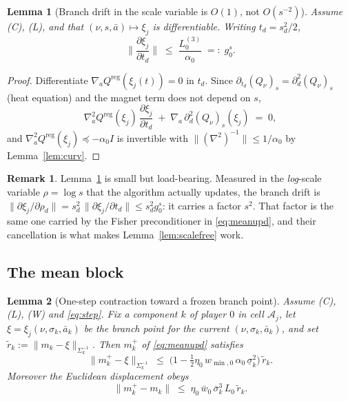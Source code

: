 \documentclass[11pt]{article}
\newtheorem{lemma}{Lemma}
\theoremstyle{definition}
\newtheorem{remark}{Remark}
\newcommand{\cA}{\mathcal{A}}
\begin{document}
\begin{lemma}[Branch drift in the scale variable is $O(1)$, not $O(s^{-2})$]
\label{lem:branchdrift}
Assume (C), (L), and that $(\nu,s,\bar a) \mapsto \xi_j$ is differentiable.
Writing $t_d = s_d^2/2$,
\[
  \Big\|\frac{\partial \xi_j}{\partial t_d}\Big\|
  \;\le\; \frac{L^{(3)}_0}{\alpha_0} \;=:\; g^s_0 .
\]
\end{lemma}

\begin{proof}
Differentiate $\nabla_a Q^{\mathrm{reg}}(\xi_j(t)) = 0$ in $t_d$. Since
$\partial_{t_d}(Q_\nu)_s = \partial_d^2 (Q_\nu)_s$ (heat equation) and the
magnet term does not depend on $s$,
\[
  \nabla^2_a Q^{\mathrm{reg}}(\xi_j)\, \frac{\partial\xi_j}{\partial t_d}
  \;+\; \nabla_a\, \partial_d^2 (Q_\nu)_s(\xi_j) \;=\; 0 ,
\]
and $\nabla^2_a Q^{\mathrm{reg}}(\xi_j) \preceq -\alpha_0 I$ is invertible with
$\|(\nabla^2)^{-1}\| \le 1/\alpha_0$ by Lemma~\ref{lem:curv}.
\end{proof}

\begin{remark}
Lemma~\ref{lem:branchdrift} is small but load-bearing. Measured in the
\emph{log}-scale variable $\rho = \log s$ that the algorithm actually updates,
the branch drift is $\|\partial\xi_j/\partial\rho_d\| = s_d^2\,
\|\partial \xi_j/\partial t_d\| \le s_d^2 g^s_0$: it carries a factor $s^2$. That
factor is the same one carried by the Fisher preconditioner in
\eqref{eq:meanupd}, and their cancellation is what makes
Lemma~\ref{lem:scalefree} work.
\end{remark}

\subsection{The mean block}

\begin{lemma}[One-step contraction toward a frozen branch point]
\label{lem:contract}
Assume (C), (L), (W) and \eqref{eq:step}. Fix a component $k$ of player $0$ in
cell $\cA_j$, let $\xi = \xi_j(\nu,\sigma_k,\bar a_k)$ be the branch point for the
\emph{current} $(\nu,\sigma_k,\bar a_k)$, and set
$\tilde r_k := \|m_k - \xi\|_{\Sigma_k^{-1}}$. Then $m_k^+$ of
\eqref{eq:meanupd} satisfies
\begin{equation}\label{eq:contract}
  \|m^+_k - \xi\|_{\Sigma_k^{-1}}
  \;\le\; \Big(1 - \tfrac{1}{2}\eta_0\, w_{\min,0}\, \alpha_0\,
  \underline\sigma_k^2\Big)\, \tilde r_k .
\end{equation}
Moreover the Euclidean displacement obeys
\begin{equation}\label{eq:vel}
  \|m^+_k - m_k\| \;\le\; \eta_0\, \bar w_0\, \bar\sigma_k^{3}\, L_0\, \tilde r_k .
\end{equation}
\end{lemma}
\end{document}
